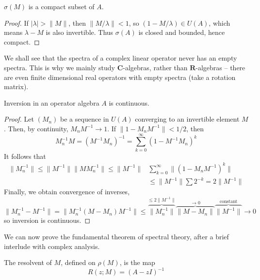 \begin{theorem}
    $\sigma(M)$ is a compact subset of $A$.
\end{theorem}
\begin{proof}
    If $|\lambda| > \|M\|$, then $\| M/\lambda \| < 1$, so $(1 - M/\lambda) \in U(A)$, which means $\lambda - M$ is also invertible. Thus $\sigma(A)$ is closed and bounded, hence compact.
\end{proof}

We shall see that the spectra of a complex linear operator never has an empty spectra. This is why we mainly study $\mathbf{C}$-algebras, rather than $\mathbf{R}$-algebras -- there are even finite dimensional real operators with empty spectra (take a rotation matrix).

\begin{lemma}
    Inversion in an operator algebra $A$ is continuous.
\end{lemma}
\begin{proof}
    Let $(M_n)$ be a sequence in $U(A)$ converging to an invertible element $M$. Then, by continuity, $M_nM^{-1} \to 1$. If $\| 1 - M_n M^{-1} \| < 1/2$, then
    \[ M_n^{-1} M = (M^{-1}M_n)^{-1} = \sum_{k = 0}^\infty (1 - M^{-1}M_n)^k \]
    It follows that
    \begin{align*}
        \| M_n^{-1} \| \leq \| M^{-1} \| \| M M_n^{-1} \| \leq \| M^{-1} \| &\sum_{k = 0}^\infty \| (1 - M_nM^{-1})^k \|\\
        &\leq \| M^{-1} \| \sum 2^{-k} = 2 \| M^{-1} \|
    \end{align*}
    Finally, we obtain convergence of inverses,
    \[ \| M_n^{-1} - M^{-1} \| = \| M_n^{-1} (M - M_n) M^{-1} \| \leq \overbrace{\| M_n^{-1} \|}^{\leq 2 \| M^{-1} \|} \overbrace{\| M - M_n \|}^{\to 0} \overbrace{\| M^{-1} \|}^{\text{constant}} \to 0 \]
    so inversion is continuous.
\end{proof}

We can now prove the fundamental theorem of spectral theory, after a brief interlude with complex analysis.

\begin{definition}
    The resolvent of $M$, defined on $\rho(M)$, is the map
    \[ R(z; M) = (A - zI)^{-1} \]
\end{definition}

